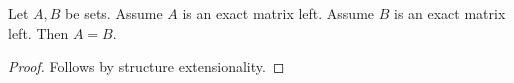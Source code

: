 

\begin{proposition}\label{incomplete_record_extensionality}
    Let $A,B$ be sets.
    Assume $A$ is an exact matrix left.
    Assume $B$ is an exact matrix left.
    Then $A=B$.
\end{proposition}
\begin{proof}
    Follows by structure extensionality.
\end{proof}
